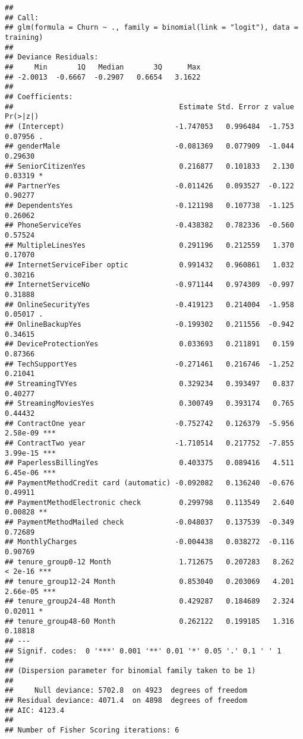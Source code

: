 \documentclass[
]{article}
\begin{document}
\begin{verbatim}
## 
## Call:
## glm(formula = Churn ~ ., family = binomial(link = "logit"), data = training)
## 
## Deviance Residuals: 
##     Min       1Q   Median       3Q      Max  
## -2.0013  -0.6667  -0.2907   0.6654   3.1622  
## 
## Coefficients:
##                                       Estimate Std. Error z value Pr(>|z|)    
## (Intercept)                          -1.747053   0.996484  -1.753  0.07956 .  
## genderMale                           -0.081369   0.077909  -1.044  0.29630    
## SeniorCitizenYes                      0.216877   0.101833   2.130  0.03319 *  
## PartnerYes                           -0.011426   0.093527  -0.122  0.90277    
## DependentsYes                        -0.121198   0.107738  -1.125  0.26062    
## PhoneServiceYes                      -0.438382   0.782336  -0.560  0.57524    
## MultipleLinesYes                      0.291196   0.212559   1.370  0.17070    
## InternetServiceFiber optic            0.991432   0.960861   1.032  0.30216    
## InternetServiceNo                    -0.971144   0.974309  -0.997  0.31888    
## OnlineSecurityYes                    -0.419123   0.214004  -1.958  0.05017 .  
## OnlineBackupYes                      -0.199302   0.211556  -0.942  0.34615    
## DeviceProtectionYes                   0.033693   0.211891   0.159  0.87366    
## TechSupportYes                       -0.271461   0.216746  -1.252  0.21041    
## StreamingTVYes                        0.329234   0.393497   0.837  0.40277    
## StreamingMoviesYes                    0.300749   0.393174   0.765  0.44432    
## ContractOne year                     -0.752742   0.126379  -5.956 2.58e-09 ***
## ContractTwo year                     -1.710514   0.217752  -7.855 3.99e-15 ***
## PaperlessBillingYes                   0.403375   0.089416   4.511 6.45e-06 ***
## PaymentMethodCredit card (automatic) -0.092082   0.136240  -0.676  0.49911    
## PaymentMethodElectronic check         0.299798   0.113549   2.640  0.00828 ** 
## PaymentMethodMailed check            -0.048037   0.137539  -0.349  0.72689    
## MonthlyCharges                       -0.004438   0.038272  -0.116  0.90769    
## tenure_group0-12 Month                1.712675   0.207283   8.262  < 2e-16 ***
## tenure_group12-24 Month               0.853040   0.203069   4.201 2.66e-05 ***
## tenure_group24-48 Month               0.429287   0.184689   2.324  0.02011 *  
## tenure_group48-60 Month               0.262122   0.199185   1.316  0.18818    
## ---
## Signif. codes:  0 '***' 0.001 '**' 0.01 '*' 0.05 '.' 0.1 ' ' 1
## 
## (Dispersion parameter for binomial family taken to be 1)
## 
##     Null deviance: 5702.8  on 4923  degrees of freedom
## Residual deviance: 4071.4  on 4898  degrees of freedom
## AIC: 4123.4
## 
## Number of Fisher Scoring iterations: 6
\end{verbatim}
\end{document}

